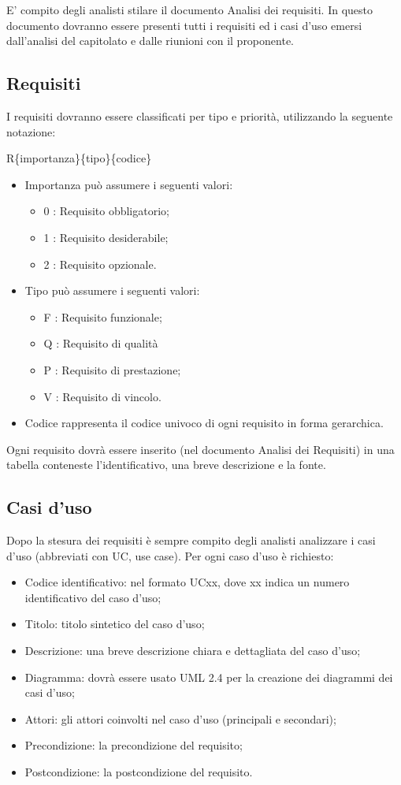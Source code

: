 E' compito degli analisti stilare il documento Analisi dei requisiti.
In questo documento dovranno essere presenti tutti i requisiti ed i casi d'uso emersi dall'analisi del capitolato e dalle riunioni con il proponente.\\

\subsection{Requisiti}

I requisiti dovranno essere classificati per tipo e priorità, utilizzando la seguente notazione:

R\{importanza\}\{tipo\}\{codice\}
\begin{itemize}
  \item Importanza può assumere i seguenti valori:
\begin{itemize}
	\item {0} : Requisito obbligatorio;
	\item {1} : Requisito desiderabile;
	\item {2} : Requisito opzionale.
\end{itemize}
  \item Tipo può assumere i seguenti valori:
\begin{itemize}
	\item {F} : Requisito funzionale;
	\item {Q} : Requisito di qualità
	\item {P} : Requisito di prestazione;
	\item {V} : Requisito di vincolo.
\end{itemize}
  \item Codice rappresenta il codice univoco di ogni requisito in forma gerarchica.
\end{itemize}
Ogni requisito dovrà essere inserito (nel documento Analisi dei Requisiti) in una tabella conteneste l'identificativo, una breve descrizione e la fonte.

\subsection{Casi d'uso}

Dopo la stesura dei requisiti è sempre compito degli analisti analizzare i casi d'uso (abbreviati con UC, use case).
Per ogni caso d'uso è richiesto:
\begin{itemize}
	\item Codice identificativo: nel formato UCxx, dove xx indica un numero identificativo del caso d'uso;
	\item Titolo: titolo sintetico del caso d'uso;
	\item Descrizione: una breve descrizione chiara e dettagliata del caso d'uso;
	\item Diagramma: dovrà essere usato UML 2.4 per la creazione dei diagrammi dei casi d'uso;
	\item Attori: gli attori coinvolti nel caso d'uso (principali e secondari);
	\item Precondizione: la precondizione del requisito;
	\item Postcondizione: la postcondizione del requisito.
\end{itemize}


